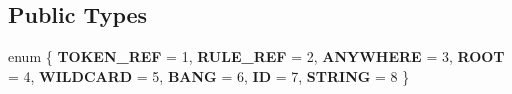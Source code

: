 \subsection*{Public Types}
\begin{DoxyCompactItemize}
\item 
\mbox{\label{classXPathLexer_a319782eda7dff4d3e3f9d4a69a00b266}} 
enum \{ \newline
{\bfseries T\+O\+K\+E\+N\+\_\+\+R\+EF} = 1, 
{\bfseries R\+U\+L\+E\+\_\+\+R\+EF} = 2, 
{\bfseries A\+N\+Y\+W\+H\+E\+RE} = 3, 
{\bfseries R\+O\+OT} = 4, 
\newline
{\bfseries W\+I\+L\+D\+C\+A\+RD} = 5, 
{\bfseries B\+A\+NG} = 6, 
{\bfseries ID} = 7, 
{\bfseries S\+T\+R\+I\+NG} = 8
 \}
\end{DoxyCompactItemize}
